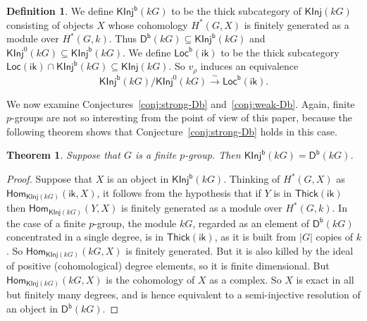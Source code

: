 \documentclass[12pt]{amsart}
\newcommand{\DD}{\mathsf{D}}%
\newcommand{\Db}{\DD^{\mathsf{b}}}%
\newcommand{\Hom}{\mathsf{Hom}}
\newcommand{\ik}{\mathsf{ik}}
\newcommand{\kG}{\kk G}
\newcommand{\kk}{k}
\newcommand{\KInj}{\mathsf{KInj}}
\newcommand{\KInjb}{\KInj^{\mathsf{b}}}
\newcommand{\Loc}{\mathsf{Loc}}
\newcommand{\Locb}{\Loc^{\mathsf b}}
\newcommand{\Thick}{\mathsf{Thick}}
\numberwithin{equation}{section}
\theoremstyle{plain}
\newtheorem{theorem}[equation]{Theorem}
\theoremstyle{definition}
\newtheorem{definition}[equation]{Definition}
\theoremstyle{remark}
\begin{document}
\begin{definition}
We define $\KInjb(\kG)$ to be the thick subcategory of
$\KInj(\kG)$ consisting of objects $X$ whose cohomology
$H^*(G,X)$ is finitely generated as a module over $H^*(G,k)$.
Thus $\Db(\kG)\subseteq\KInjb(\kG)$ and $\KInj^0(\kG)\subseteq\KInjb(\kG)$.
We define $\Locb(\ik)$ to be the thick subcategory 
$\Loc(\ik)\cap \KInjb(\kG)\subseteq\KInj(\kG)$. So $v_\rho$ induces an
equivalence
\begin{equation}\label{eq:KInjb/KInj0}
\KInjb(\kG)/\KInj^0(\kG)\xrightarrow{\sim}\Locb(\ik).
\end{equation}
\end{definition}

We now examine Conjectures~\ref{conj:strong-Db} and~\ref{conj:weak-Db}.
Again, finite $p$-groups are not so interesting from the point of view
of this paper, because the following theorem shows that
Conjecture~\ref{conj:strong-Db} holds in this case.

\begin{theorem}\label{th:Kinjb-pgroup}
Suppose that $G$ is a finite $p$-group. Then $\KInjb(\kG)=\Db(\kG)$.
\end{theorem}
\begin{proof}
  Suppose that $X$ is an object in $\KInjb(\kG)$.
Thinking of $H^*(G,X)$ as $\Hom_{\KInj(\kG)}(\ik,X)$, it follows from
the hypothesis that if $Y$ is in $\Thick(\ik)$ then
$\Hom_{\KInj(\kG)}(Y,X)$ is finitely generated as a module over
$H^*(G,\kk)$. In the case of a finite $p$-group, the module $\kG$,
regarded as an element of $\Db(\kG)$ concentrated in a single degree,
is in $\Thick(\ik)$, as it is built from $|G|$ copies of $\kk$. So 
$\Hom_{\KInj(\kG)}(\kG,X)$ is finitely generated. But it is also
killed by the ideal of positive (cohomological) degree elements, so it is finite
dimensional. But $\Hom_{\KInj(\kG)}(\kG,X)$ is the cohomology of $X$ as
a complex. So $X$ is exact in all but finitely many degrees, and is
hence equivalent to a semi-injective resolution of an object in $\Db(\kG)$.
\end{proof}
\end{document}
